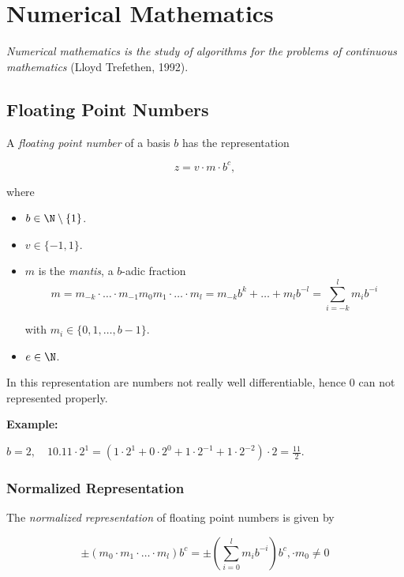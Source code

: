 \newpage 
\chapter{Numerical Mathematics}

\emph{Numerical mathematics is the study of algorithms for the problems of continuous mathematics} (Lloyd Trefethen, 1992).

\section{Floating Point Numbers}

A \emph{floating point number} of a basis \(b\) has the representation

\[
    z = v \cdot m \cdot b^c,
\]

where 

\begin{itemize} 

    \item \(b \in \N \setminus \{1\}\). 

    \item \(v \in \{-1, 1\}\). 

    \item \(m\) is the \emph{mantis}, a \(b\)-adic fraction
    \[
        m = m_{-k} \cdot \dots \cdot m_{-1} m_0 m_{1} \cdot \dots \cdot m_{l} = m_{-k}b^k + \dots + m_l b^{-l} = \sum_{i = -k}^{l} m_i b^{-i}
    \]

    with \(m_i \in \{0, 1, \dots, b - 1\}\).

    \item \(e \in \N\).

\end{itemize}

In this representation are numbers not really well differentiable, hence 0 can not represented properly.

\textbf{Example:}

\(b = 2, \quad 10.11\cdot 2^1 = (1 \cdot 2^1 + 0 \cdot 2^0 + 1 \cdot 2^{-1} + 1 \cdot 2^{-2}) \cdot 2 = \frac{11}{2}\).

\subsection{Normalized Representation}

The \emph{normalized representation} of floating point numbers is given by 

\[
    \pm (m_0 \cdot m_1 \cdot \dots \cdot m_l)b^c = \pm \left(\sum_{i = 0}^{l} m_i b^{-i} \right)b^c, \cdot m_0 \ne 0
\]

